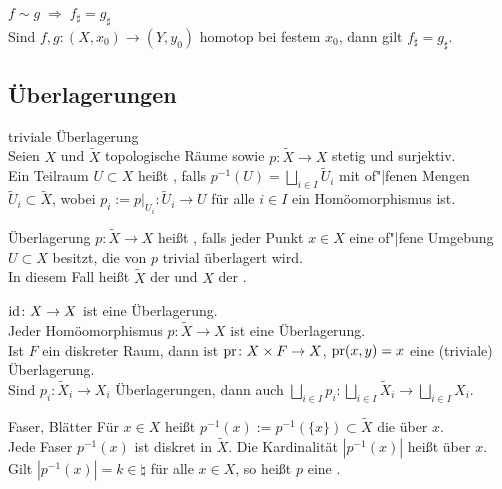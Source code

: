 \begin{Satz}{$f \sim g \;\Rightarrow\; f_\sharp = g_\sharp$}\\
    Sind $f, g\colon (X, x_0) \rightarrow (Y, y_0)$ homotop bei festem $x_0$,
    dann gilt $f_\sharp = g_\sharp$.
\end{Satz}

\subsection{%
    Überlagerungen%
}

\begin{Def}{triviale Überlagerung}\\
    Seien $X$ und $\widetilde{X}$ topologische Räume sowie
    $p\colon \widetilde{X} \rightarrow X$ stetig und surjektiv. \\
    Ein Teilraum $U \subset X$ heißt ,
    falls $p^{-1}(U) = \bigsqcup_{i \in I} \widetilde{U}_i$
    mit of"|fenen Mengen $\widetilde{U}_i \subset \widetilde{X}$, wobei
    $p_i := p|_{U_i}\colon \widetilde{U}_i \rightarrow U$ für alle $i \in I$
    ein Homöomorphismus ist.
\end{Def}

\begin{Def}{Überlagerung}
    $p\colon \widetilde{X} \rightarrow X$ heißt , falls
    jeder Punkt $x \in X$ eine of"|fene Umgebung $U \subset X$ besitzt,
    die von $p$ trivial überlagert wird. \\
    In diesem Fall heißt $\widetilde{X}$ der  und
    $X$ der .
\end{Def}

\begin{Bsp}
    $\operatorname{id}\colon X \rightarrow X$ ist eine Überlagerung. \\
    Jeder Homöomorphismus $p\colon \widetilde{X} \rightarrow X$
    ist eine Überlagerung. \\
    Ist $F$ ein diskreter Raum, dann ist $\operatorname{pr}\colon X \times F \rightarrow X$,
    $\operatorname{pr}(x, y) = x$ eine (triviale) Überlagerung. \\
    Sind $p_i\colon \widetilde{X}_i \rightarrow X_i$ Überlagerungen, dann auch
    $\bigsqcup_{i \in I} p_i\colon \bigsqcup_{i \in I} \widetilde{X}_i
    \rightarrow \bigsqcup_{i \in I} X_i$.
\end{Bsp}

\begin{Def}{Faser, Blätter}
    Für $x \in X$ heißt $p^{-1}(x) := p^{-1}(\{x\}) \subset \widetilde{X}$ die
     über $x$. \\
    Jede Faser $p^{-1}(x)$ ist diskret in $\widetilde{X}$.
    Die Kardinalität $|p^{-1}(x)|$ heißt
     über $x$. \\
    Gilt $|p^{-1}(x)| = k \in \natural$ für alle $x \in X$, so heißt $p$ eine
    .
\end{Def}


